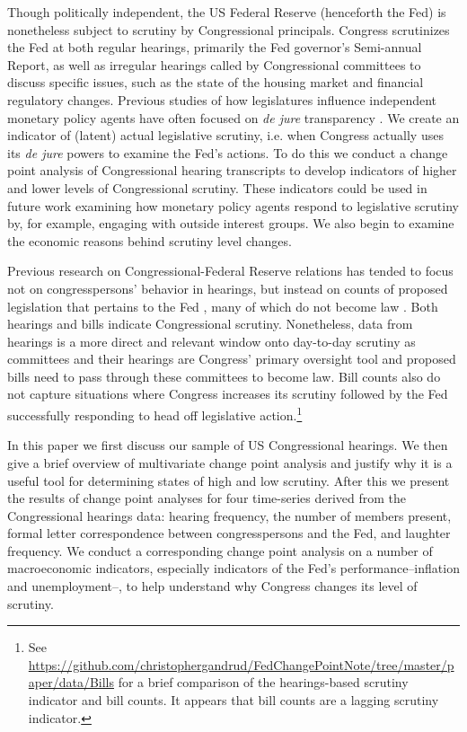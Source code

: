 \documentclass[a4paper]{article}\usepackage[]{graphicx}\usepackage[]{color}
\begin{document}
Though politically independent, the US Federal Reserve (henceforth the Fed) is nonetheless subject to scrutiny by Congressional principals. Congress scrutinizes the Fed at both regular hearings, primarily the Fed governor's Semi-annual Report, as well as irregular hearings called by Congressional committees to discuss specific issues, such as the state of the housing market and financial regulatory changes. Previous studies of how legislatures influence independent monetary policy agents have often focused on \emph{de jure} transparency \citep[for example][]{Stasavage2003}. We create an indicator of (latent) actual legislative scrutiny, i.e. when Congress actually uses its \emph{de jure} powers to examine the Fed's actions. To do this we conduct a change point analysis \citep{SenSrivastava1975, Killick2013, Matteson2014} of Congressional hearing transcripts to develop indicators of higher and lower levels of Congressional scrutiny. These indicators could be used in future work examining how monetary policy agents respond to legislative scrutiny by, for example, engaging with outside interest groups. We also begin to examine the economic reasons behind scrutiny level changes.

Previous research on Congressional-Federal Reserve relations has tended to focus not on congresspersons' behavior in hearings, but instead on counts of proposed legislation that pertains to the Fed \citep[e.g.][]{Kettl1988}, many of which do not become law \citep{Binder2014}. Both hearings and bills indicate Congressional scrutiny. Nonetheless, data from hearings is a more direct and relevant window onto day-to-day scrutiny as committees and their hearings are Congress' primary oversight tool \citep[][382]{oleszek2013} and proposed bills need to pass through these committees to become law. Bill counts also do not capture situations where Congress increases its scrutiny followed by the Fed successfully responding to head off legislative action.\footnote{See \url{https://github.com/christophergandrud/FedChangePointNote/tree/master/paper/data/Bills} for a brief comparison of the hearings-based scrutiny indicator and bill counts. It appears that bill counts are a lagging scrutiny indicator.}

In this paper we first discuss our sample of US Congressional hearings. We then give a brief overview of multivariate change point analysis and justify why it is a useful tool for determining states of high and low scrutiny. After this we present the results of change point analyses for four time-series derived from the Congressional hearings data: hearing frequency, the number of members present, formal letter correspondence between congresspersons and the Fed, and laughter frequency. We conduct a corresponding change point analysis on a number of macroeconomic indicators, especially indicators of the Fed's performance--inflation and unemployment--, to help understand why Congress changes its level of scrutiny.
\end{document}
